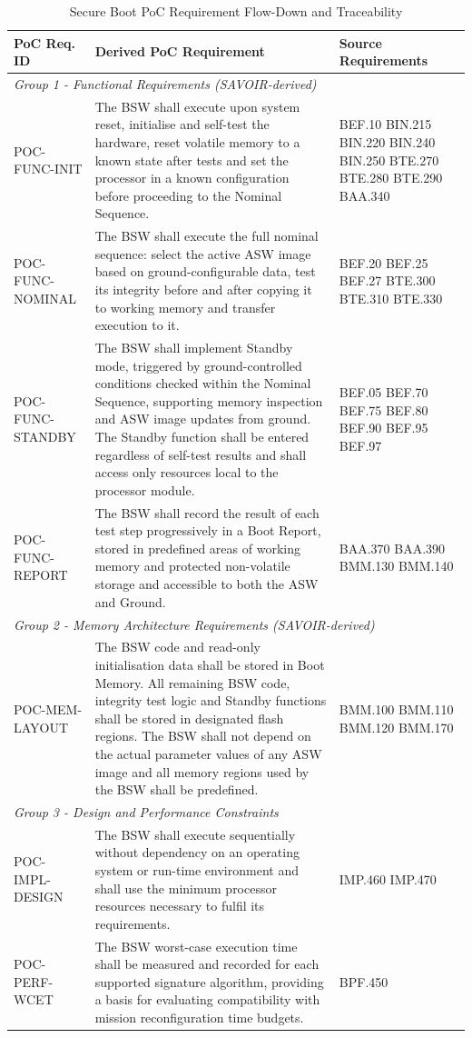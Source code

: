 \begin{table}[H]
\centering
\begin{tabular}{|l|p{6.5cm}|p{5.5cm}|}
\hline
\textbf{PoC Req. ID} & \textbf{Derived PoC Requirement} & \textbf{Source Requirements} \\
\hline
\multicolumn{3}{|l|}{\textit{Group 1 - Functional Requirements (SAVOIR-derived)}} \\
\hline
POC-FUNC-INIT &
The BSW shall execute upon system reset, initialise and self-test the hardware, reset volatile memory to a known state after tests and set the processor in a known configuration before proceeding to the Nominal Sequence. &
BEF.10 BIN.215 BIN.220 BIN.240 BIN.250 BTE.270 BTE.280 BTE.290 BAA.340 \\
\hline
POC-FUNC-NOMINAL &
The BSW shall execute the full nominal sequence: select the active ASW image based on ground-configurable data, test its integrity before and after copying it to working memory and transfer execution to it. &
BEF.20 BEF.25 BEF.27 BTE.300 BTE.310 BTE.330 \\
\hline
POC-FUNC-STANDBY &
The BSW shall implement Standby mode, triggered by ground-controlled conditions checked within the Nominal Sequence, supporting memory inspection and ASW image updates from ground. The Standby function shall be entered regardless of self-test results and shall access only resources local to the processor module. &
BEF.05 BEF.70 BEF.75 BEF.80 BEF.90 BEF.95 BEF.97 \\
\hline
POC-FUNC-REPORT &
The BSW shall record the result of each test step progressively in a Boot Report, stored in predefined areas of working memory and protected non-volatile storage and accessible to both the ASW and Ground. &
BAA.370 BAA.390 BMM.130 BMM.140 \\
\hline
\multicolumn{3}{|l|}{\textit{Group 2 - Memory Architecture Requirements (SAVOIR-derived)}} \\
\hline
POC-MEM-LAYOUT &
The BSW code and read-only initialisation data shall be stored in Boot Memory. All remaining BSW code, integrity test logic and Standby functions shall be stored in designated flash regions. The BSW shall not depend on the actual parameter values of any ASW image and all memory regions used by the BSW shall be predefined. &
BMM.100 BMM.110 BMM.120 BMM.170 \\
\hline
\multicolumn{3}{|l|}{\textit{Group 3 - Design and Performance Constraints}} \\
\hline
POC-IMPL-DESIGN &
The BSW shall execute sequentially without dependency on an operating system or run-time environment and shall use the minimum processor resources necessary to fulfil its requirements. &
IMP.460 IMP.470 \\
\hline
POC-PERF-WCET &
The BSW worst-case execution time shall be measured and recorded for each supported signature algorithm, providing a basis for evaluating compatibility with mission reconfiguration time budgets. &
BPF.450 \\
\hline
\end{tabular}
\caption{Secure Boot PoC Requirement Flow-Down and Traceability}
\label{table:flow-down}
\end{table}

